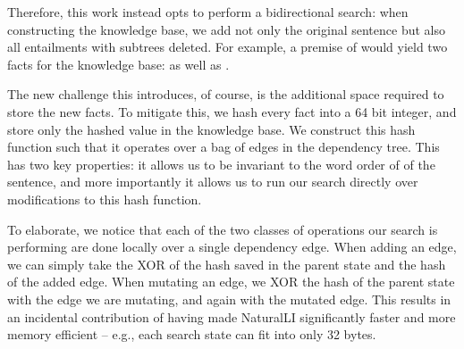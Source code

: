 Therefore, this work instead opts to perform a bidirectional search:
  when constructing the knowledge base, we add not only the original sentence but
  also all entailments with subtrees deleted.
For example, a premise of  would yield two facts
  for the knowledge base:  as well as .

The new challenge this introduces, of course, is the additional space required
  to store the new facts.
To mitigate this, we hash every fact into a 64 bit integer, and store only the hashed 
  value in the knowledge base.
We construct this hash function such that it operates over a bag of edges in the
  dependency tree.
This has two key properties: it allows us to be invariant to the word order of
  of the sentence, and more importantly it allows us to run our search directly
  over modifications to this hash function.

To elaborate, we notice that each of the two classes of operations our search is
  performing are done locally over a single dependency edge.
When adding an edge, we can simply take the XOR of the hash saved in the 
  parent state and the hash of the added edge.
When mutating an edge, we XOR the hash of the parent state with the edge we are
  mutating, and again with the mutated edge.
This results in an incidental contribution of having made NaturalLI significantly
  faster and more memory efficient -- e.g., each search state can fit into
  only 32 bytes.

